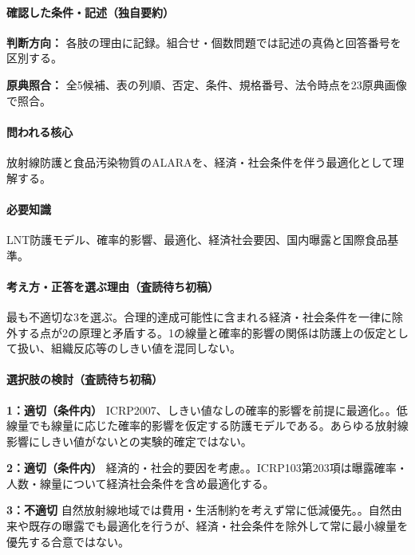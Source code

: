 \paragraph{確認した条件・記述（独自要約）}\mbox{}\par

\noindent\textbf{判断方向：} 各肢の理由に記録。組合せ・個数問題では記述の真偽と回答番号を区別する。\par

\noindent\textbf{原典照合：} 全5候補、表の列順、否定、条件、規格番号、法令時点を23原典画像で照合。\par

\paragraph{問われる核心} 放射線防護と食品汚染物質のALARAを、経済・社会条件を伴う最適化として理解する。

\paragraph{必要知識} LNT防護モデル、確率的影響、最適化、経済社会要因、国内曝露と国際食品基準。

\paragraph{考え方・正答を選ぶ理由（査読待ち初稿）} 最も不適切な3を選ぶ。合理的達成可能性に含まれる経済・社会条件を一律に除外する点が2の原理と矛盾する。1の線量と確率的影響の関係は防護上の仮定として扱い、組織反応等のしきい値を混同しない。

\paragraph{選択肢の検討（査読待ち初稿）}\mbox{}\par

\noindent\textbf{1：適切（条件内）} ICRP2007、しきい値なしの確率的影響を前提に最適化。。低線量でも線量に応じた確率的影響を仮定する防護モデルである。あらゆる放射線影響にしきい値がないとの実験的確定ではない。\par

\noindent\textbf{2：適切（条件内）} 経済的・社会的要因を考慮。。ICRP103第203項は曝露確率・人数・線量について経済社会条件を含め最適化する。\par

\noindent\textbf{3：不適切} 自然放射線地域では費用・生活制約を考えず常に低減優先。。自然由来や既存の曝露でも最適化を行うが、経済・社会条件を除外して常に最小線量を優先する合意ではない。\par

